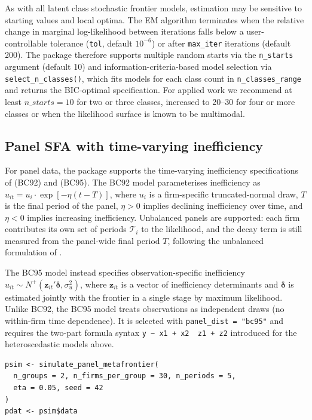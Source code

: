 As with all latent class stochastic frontier models, estimation may be
sensitive to starting values and local optima. The EM algorithm terminates
when the relative change in marginal log-likelihood between iterations
falls below a user-controllable tolerance (\texttt{tol}, default \(10^{-6}\)) or
after \texttt{max\_iter} iterations (default 200). The package therefore supports
multiple random starts via the \texttt{n\_starts} argument (default 10) and
information-criteria-based model selection via \texttt{select\_n\_classes()}, which
fits models for each class count in \texttt{n\_classes\_range} and returns the
BIC-optimal specification. For applied work we recommend at least \(n\_starts = 10\) for
two or three classes, increased to 20--30 for four or more classes or when
the likelihood surface is known to be multimodal.

\subsection{Panel SFA with time-varying inefficiency}\label{sec:panel-sfa}

For panel data, the package supports the time-varying inefficiency
specifications of \citet{battese1992} (BC92) and \citet{battese1995} (BC95). The BC92 model
parameterises inefficiency as
\(u_{it} = u_i \cdot \exp\!\left[-\eta(t - T)\right]\), where \(u_i\) is a
firm-specific truncated-normal draw, \(T\) is the final period of the panel,
\(\eta > 0\) implies declining inefficiency over time, and \(\eta < 0\) implies
increasing inefficiency. Unbalanced panels are supported: each firm
contributes its own set of periods \(\mathcal{T}_i\) to the likelihood, and
the decay term is still measured from the panel-wide final period \(T\),
following the unbalanced formulation of \citet{battese1992}.

The BC95 model instead specifies observation-specific inefficiency
\(u_{it} \sim N^+(\mathbf{z}_{it}'\boldsymbol{\delta}, \sigma_u^2)\), where
\(\mathbf{z}_{it}\) is a vector of inefficiency determinants and
\(\boldsymbol{\delta}\) is estimated jointly with the frontier in a single
stage by maximum likelihood. Unlike BC92, the BC95 model treats
observations as independent draws (no within-firm time dependence). It is
selected with \texttt{panel\_dist\ =\ "bc95"} and requires the two-part formula
syntax \texttt{y\ \textasciitilde{}\ x1\ +\ x2\ \textbar{}\ z1\ +\ z2} introduced for the heteroscedastic models
above.

\begin{verbatim}
psim <- simulate_panel_metafrontier(
  n_groups = 2, n_firms_per_group = 30, n_periods = 5,
  eta = 0.05, seed = 42
)
pdat <- psim$data
\end{verbatim}

